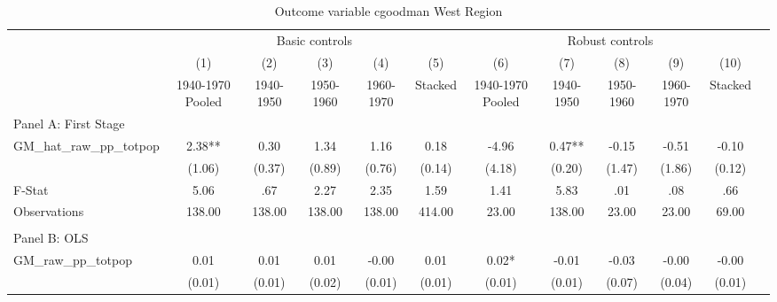  \begin{table}[htbp]\centering {} \begin{threeparttable} \caption{Outcome variable cgoodman West Region} \begin{tabular}{l*{11}{c}} \toprule
          &\multicolumn{5}{c}{Basic controls}                                   &\multicolumn{5}{c}{Robust controls}                                  \\\cmidrule(lr){2-6}\cmidrule(lr){7-11}
          &\multicolumn{1}{c}{(1)}&\multicolumn{1}{c}{(2)}&\multicolumn{1}{c}{(3)}&\multicolumn{1}{c}{(4)}&\multicolumn{1}{c}{(5)}&\multicolumn{1}{c}{(6)}&\multicolumn{1}{c}{(7)}&\multicolumn{1}{c}{(8)}&\multicolumn{1}{c}{(9)}&\multicolumn{1}{c}{(10)}\\
          &\multicolumn{1}{c}{1940-1970 Pooled}&\multicolumn{1}{c}{1940-1950}&\multicolumn{1}{c}{1950-1960}&\multicolumn{1}{c}{1960-1970}&\multicolumn{1}{c}{Stacked}&\multicolumn{1}{c}{1940-1970 Pooled}&\multicolumn{1}{c}{1940-1950}&\multicolumn{1}{c}{1950-1960}&\multicolumn{1}{c}{1960-1970}&\multicolumn{1}{c}{Stacked}\\
\cmidrule(lr){1-11}
\multicolumn{10}{l}{Panel A: First Stage}\\
\cmidrule(lr){1-11}
GM\_hat\_raw\_pp\_totpop&      2.38** &      0.30   &      1.34   &      1.16   &      0.18   &     -4.96   &      0.47** &     -0.15   &     -0.51   &     -0.10   \\
          &    (1.06)   &    (0.37)   &    (0.89)   &    (0.76)   &    (0.14)   &    (4.18)   &    (0.20)   &    (1.47)   &    (1.86)   &    (0.12)   \\
\midrule
F-Stat    &      5.06   &       .67   &      2.27   &      2.35   &      1.59   &      1.41   &      5.83   &       .01   &       .08   &       .66   \\
Observations&    138.00   &    138.00   &    138.00   &    138.00   &    414.00   &     23.00   &    138.00   &     23.00   &     23.00   &     69.00   \\
\cmidrule[\heavyrulewidth](lr){1-11} \\ \cmidrule[\heavyrulewidth](lr){1-11}
\multicolumn{10}{l}{Panel B: OLS}\\
\cmidrule(lr){1-11}
GM\_raw\_pp\_totpop&      0.01   &      0.01   &      0.01   &     -0.00   &      0.01   &      0.02*  &     -0.01   &     -0.03   &     -0.00   &     -0.00   \\
          &    (0.01)   &    (0.01)   &    (0.02)   &    (0.01)   &    (0.01)   &    (0.01)   &    (0.01)   &    (0.07)   &    (0.04)   &    (0.01)   \\

\end{tabular}
\end{threeparttable}
\end{table}
